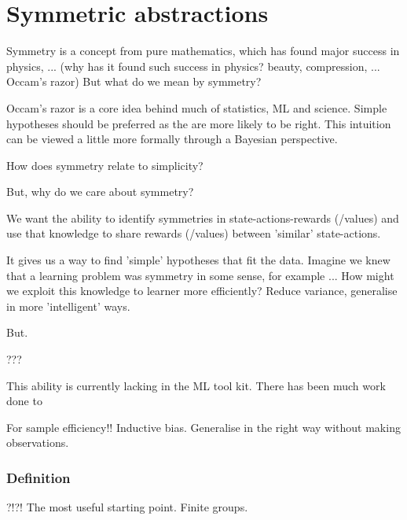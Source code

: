 \newpage
\section{Symmetric abstractions}\label{symmstric-abstractions}



Symmetry is a concept from pure mathematics, which has found major success in physics, ...
(why has it found such success in physics? beauty, compression, ... Occam's razor)
But what do we mean by symmetry?



Occam's razor is a core idea behind much of statistics, ML and science. Simple
hypotheses should be preferred as the are more likely to be right. This intuition
can be viewed a little more formally through a Bayesian perspective.

How does symmetry relate to simplicity?

But, why do we care about symmetry?
\begin{displayquote}
We want the ability to identify symmetries in state-actions-rewards (/values) and use that knowledge to share rewards (/values) between 'similar' state-actions.
\end{displayquote}
It gives us a way to find 'simple' hypotheses that fit the data.
Imagine we knew that a learning problem was symmetry in some sense, for example ...
How might we exploit this knowledge to learner more efficiently?
Reduce variance, generalise in more 'intelligent' ways.

But.

???

This ability is currently lacking in the ML tool kit. There has been much work done
to

For sample efficiency!! Inductive bias. Generalise in the right way without making observations.

\subsubsection{Definition}

?!?!
The most useful starting point. Finite groups.

